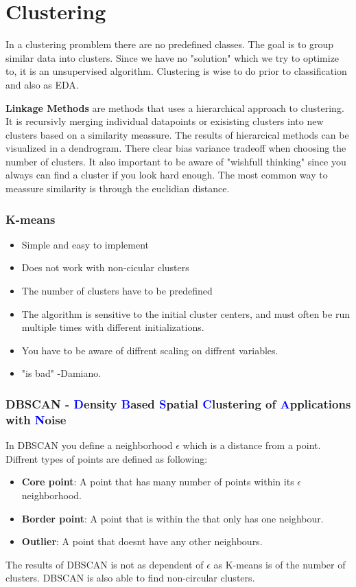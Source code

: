 \section{Clustering}
In a clustering promblem there are no predefined classes. The goal is to group similar data into clusters. Since we have no "solution" which we try to optimize to, it is an unsupervised algorithm. Clustering is wise to do prior to classification and also as EDA.

\textbf{Linkage Methods} are methods that uses a hierarchical approach to clustering. It is recursivly merging individual datapoints or exisisting clusters into new clusters based on a similarity meassure. The results of hierarcical methods can be visualized in a dendrogram. There clear bias variance tradeoff when choosing the number of clusters. It also important to be aware of "wishfull thinking" since you always can find a cluster if you look hard enough. The most common way to meassure similarity is through the euclidian distance. \newline

\subsubsection{K-means}
\begin{itemize}
    \item Simple and easy to implement
    \item Does not work with non-cicular clusters
    \item The number of clusters have to be predefined
    \item The algorithm is sensitive to the initial cluster centers, and must often be run multiple times with different initializations.
    \item You have to be aware of diffrent scaling on diffrent variables.
    \item "is bad" -Damiano.
\end{itemize}

\subsubsection{DBSCAN - \textcolor{blue}{D}ensity \textcolor{blue}{B}ased \textcolor{blue}{S}patial \textcolor{blue}{C}lustering of \textcolor{blue}{A}pplications with \textcolor{blue}{N}oise}
In DBSCAN you define a neighborhood $\epsilon$ which is a distance from a point. Diffrent types of points are defined as following:
\begin{itemize}
    \item \textbf{Core point}: A point that has many number of points within its $\epsilon$ neighborhood.
    \item \textbf{Border point}: A point that is within the that only has one neighbour.
    \item \textbf{Outlier}: A point that doesnt have any other neighbours.
\end{itemize}
The results of DBSCAN is not as dependent of $\epsilon$ as K-means is of the number of clusters. DBSCAN is also able to find non-circular clusters. \newline

